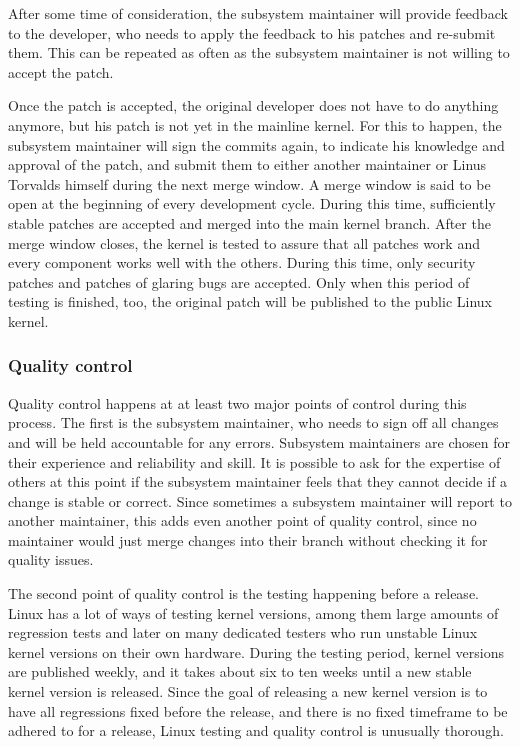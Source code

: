 \documentclass{sig-alternate-05-2015}
\begin{document}
After some time of consideration, the subsystem maintainer will provide feedback to the developer, who needs to apply the feedback to his patches and re-submit them.
This can be repeated as often as the subsystem maintainer is not willing to accept the patch.

Once the patch is accepted, the original developer does not have to do anything anymore, but his patch is not yet in the mainline kernel.
For this to happen, the subsystem maintainer will sign the commits again, to indicate his knowledge and approval of the patch, and submit them to either another maintainer or Linus Torvalds himself during the next merge window.
A merge window is said to be open at the beginning of every development cycle.
During this time, sufficiently stable patches are accepted and merged into the main kernel branch.
After the merge window closes, the kernel is tested to assure that all patches work and every component works well with the others.
During this time, only security patches and patches of glaring bugs are accepted.
Only when this period of testing is finished, too, the original patch will be published to the public Linux kernel.

\subsubsection{Quality control}

Quality control happens at at least two major points of control during this process.
The first is the subsystem maintainer, who needs to sign off all changes and will be held accountable for any errors.
Subsystem maintainers are chosen for their experience and reliability and skill.
It is possible to ask for the expertise of others at this point if the subsystem maintainer feels that they cannot decide if a change is stable or correct.
Since sometimes a subsystem maintainer will report to another maintainer, this adds even another point of quality control, since no maintainer would just merge changes into their branch without checking it for quality issues.

The second point of quality control is the testing happening before a release.
Linux has a lot of ways of testing kernel versions, among them large amounts of regression tests and later on many dedicated testers who run unstable Linux kernel versions on their own hardware.
During the testing period, kernel versions are published weekly, and it takes about six to ten weeks until a new stable kernel version is released.
Since the goal of releasing a new kernel version is to have all regressions fixed before the release, and there is no fixed timeframe to be adhered to for a release, Linux testing and quality control is unusually thorough.
\end{document}
